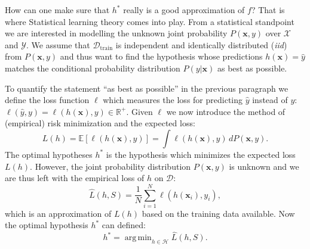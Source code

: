 \documentclass[a4paper, twoside, nobib]{tufte-book}
\newcommand{\q}[1]{``#1''}
\renewcommand{\vec}[1]{\mathbf{#1}}
\DeclareMathOperator*{\argmin}{arg\,min} %
\begin{document}
How can one make sure that $h^*$ really is a good approximation of $f$? That is where Statistical learning theory comes into play. From a statistical standpoint we are interested in modelling the unknown joint probability $P(\vec{x}, y)$ over $\mathcal{X}$ and $\mathcal{Y}$. We assume that $\mathcal{D}_\mathrm{train}$ is independent and identically distributed (\emph{iid}) from $P(\vec{x}, y)$ and thus want to find the hypothesis whose predictions $h(\vec{x})=\hat{y}$ matches the conditional probability distribution $P(y|\vec{x})$ as best as possible. 

To quantify the statement \q{as best as possible} in the previous paragraph we define the loss function $\ell$ which measures the loss for predicting $\hat{y}$ instead of $y$: $\ell(\hat{y}, y) = \ell(h(\vec{x}), y) \in \mathbb{R}^+$. Given $\ell$ we now introduce the method of (empirical) risk minimization \citep{vapnikPrinciplesRiskMinimization1991} and the expected loss:
\begin{equation} 
  \label{eq:L}
  L(h) = \mathbb{E} \left[\ell(h(\vec{x}), y) \right] = \int \ell(h(\vec{x}), y)  \, dP(\vec{x}, y).
  \end{equation}
The optimal hypotheses $h^*$ is the hypothesis which minimizes the expected loss $L(h)$. However, the joint probability distribution $P(\vec{x}, y)$ is unknown and we are thus left with the empirical loss of $h$ on $\mathcal{D}$:
\begin{equation}
  \label{eq:L_hat}
  \hat{L}(h, S) = \frac{1}{N} \sum_{i=1}^{N} \ell(h(\vec{x}_i), y_i), %
\end{equation}
which is an approximation of $L(h)$ based on the training data available. 
Now the optimal hypothesis $h^*$ can defined:
\begin{equation}
  h^* = \argmin_{h\in\mathcal{H}} \hat{L}(h, S).
\end{equation}
\end{document}
